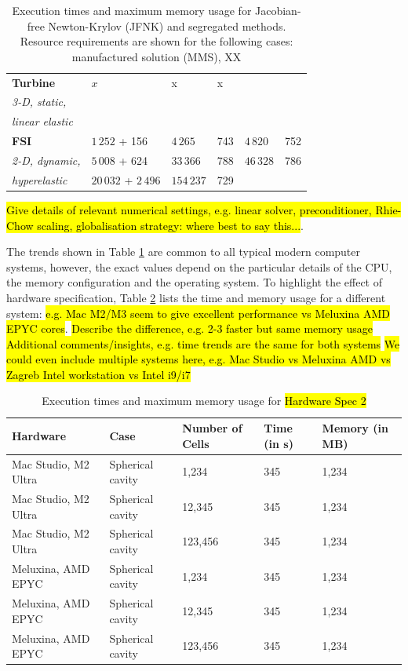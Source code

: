 \documentclass[sn-mathphys,Numbered]{sn-jnl}%
\begin{document}
\begin{table}[!htb]
\begin{tabular}{ll|ll|ll}
			\hline
			\textbf{Turbine} & $x$ & x & x & & \\
			\emph{3-D, static,} & & & & & \\
			\emph{linear elastic} & & & & & \\
			\hline
			\textbf{FSI} & $1\,252$ + 156 & $4\,265$ & 743 & $4\,820$ & 752 \\
			\emph{2-D, dynamic,}	& $5\,008$ + 624 & $33\,366$ & 788 & $46\,328$ & 786 \\
			\emph{hyperelastic} & $20\,032$ + $2\,496$ & $154\,237$ & 729 & & \\
			\hline
		\end{tabular}
	\caption{Execution times and maximum memory usage for Jacobian-free Newton-Krylov (JFNK) and segregated methods. Resource requirements are shown for the following cases: manufactured solution (MMS), XX }
	\label{tab:times_memory}
\end{table}


\hl{Give details of relevant numerical settings, e.g. linear solver, preconditioner, Rhie-Chow scaling, globalisation strategy: where best to say this...}.

The trends shown in Table \ref{tab:times_memory} are common to all typical modern computer systems, however, the exact values depend on the particular details of the CPU, the memory configuration and the operating system.
To highlight the effect of hardware specification, Table \ref{tab:times_memory_spec2} lists the time and memory usage for a different system: \hl{e.g. Mac M2/M3 seem to give excellent performance vs Meluxina AMD EPYC cores}.
\hl{Describe the difference, e.g. 2-3 faster but same memory usage}
\hl{Additional comments/insights, e.g. time trends are the same for both systems}
\hl{We could even include multiple systems here, e.g. Mac Studio vs Meluxina AMD vs Zagreb Intel workstation vs Intel i9/i7}
\begin{table}[htb]
	\centering
		\begin{tabular}{lllll}
			\hline
			Hardware & Case & Number of Cells & Time (in s) & Memory (in MB) \\
			\hline 
			Mac Studio, M2 Ultra & Spherical cavity & 1,234 & 345 & 1,234  \\
			Mac Studio, M2 Ultra & Spherical cavity & 12,345 & 345 & 1,234  \\
			Mac Studio, M2 Ultra & Spherical cavity & 123,456 & 345 & 1,234  \\
			Meluxina, AMD EPYC & Spherical cavity & 1,234 & 345 & 1,234  \\
			Meluxina, AMD EPYC & Spherical cavity & 12,345 & 345 & 1,234  \\
			Meluxina, AMD EPYC & Spherical cavity & 123,456 & 345 & 1,234  \\
			\hline
		\end{tabular}
	\caption{Execution times and maximum memory usage for \hl{Hardware Spec 2}}
	\label{tab:times_memory_spec2}
\end{table}
\end{document}
